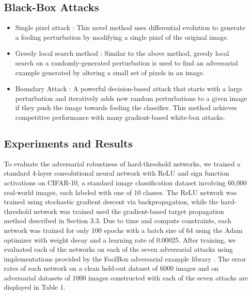 \subsection{Black-Box Attacks}

\begin{itemize}
\item Single pixel attack \cite{su2017}: This novel method uses differential evolution to generate a fooling perturbation by modifying a single pixel of the original image. 
\item Greedy local search method \cite{narodytska2016}: Similar to the above method, greedy local search on a randomly-generated perturbation is used to find an adversarial example generated by altering a small set of pixels in an image. 
\item Boundary Attack \cite{brendel2018}: A powerful decision-based attack that starts with a large perturbation and iteratively adds new random perturbations to a given image if they push the image towards fooling the classifier. This method achieves competitive performance with many gradient-based white-box attacks. 
\end{itemize}


\subsection{Experiments and Results}

To evaluate the adversarial robustness of hard-threshold networks, we trained a standard 4-layer convolutional neural network with ReLU and sign function activations on CIFAR-10, a standard image classification dataset involving 60,000 real-world images, each labeled with one of 10 classes. The ReLU network was trained using stochastic gradient descent via backpropagation, while the hard-threshold network was trained used the gradient-based target propagation method described in Section 3.3. Due to time and compute constraints, each network was trained for only 100 epochs with a batch size of 64 using the Adam optimizer \cite{kingma2015} with weight decay and a learning rate of 0.00025. After training, we evaluated each of the networks on each of the seven adversarial attacks using implementations provided by the FoolBox adversarial example library \cite{rauber2017}. The error rates of each network on a clean held-out dataset of 6000 images and on adversarial datasets of 1000 images constructed with each of the seven attacks are displayed in Table 1. 

